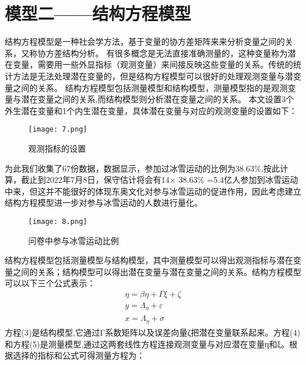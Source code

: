 \documentclass[withoutpreface,bwprint]{cumcmthesis} %
\begin{document}
\section{模型二——结构方程模型}
结构方程模型是一种社会学方法，基于变量的协方差矩阵来来分析变量之间的关系，又称协方差结构分析。
有很多概念是无法直接准确测量的，这种变量称为潜在变量，需要用一些外显指标（观测变量）来间接反映这些变量的关系。传统的统计方法是无法处理潜在变量的，但是结构方程模型可以很好的处理观测变量与潜变量之间的关系。
结构方程模型包括测量模型和结构模型，测量模型指的是观测变量与潜在变量之间的关系,而结构模型则分析潜在变量之间的关系。
本文设置3个外生潜在变量和1个内生潜在变量，具体潜在变量与对应的观测变量的设置如下：
\begin{figure}[H]
	\centering
	\texttt{[image: 7.png]}
	\caption{观测指标的设置}
	\label{7}
\end{figure}
为此我们收集了67份数据，数据显示，参加过冰雪运动的比例为38.63\%,按此计算，截止到2022年7月8日，保守估计将会有14$ \times $ 38.63\% =5.4亿人参加到冰雪运动中来，但这并不能很好的体现东奥文化对参与冰雪运动的促进作用，因此考虑建立结构方程模型进一步对参与冰雪运动的人数进行量化。
\begin{figure}[H]
	\centering
	\texttt{[image: 8.png]}
	\caption{问卷中参与冰雪运动比例}
	\label{8}
\end{figure}
结构方程模型包括测量模型与结构模型，其中测量模型可以得出观测指标与潜在变量之间的关系；结构模型可以得出潜在变量与潜在变量之间的关系。结构方程模型可以以下三个公式表示：
\begin{align}
	\eta=\beta \eta+\Gamma \xi+\zeta \\
	y=\Lambda_{\eta}+\varepsilon \\
	x=\Lambda_{\eta}+\sigma
\end{align}
方程(3)是结构模型,它通过Γ系数矩阵以及误差向量ζ把潜在变量联系起来。方程(4)和方程(5)是测量模型,通过这两套线性方程连接观测变量与对应潜在变量η和ξ。根据选择的指标和公式可得测量方程为：
\end{document}
